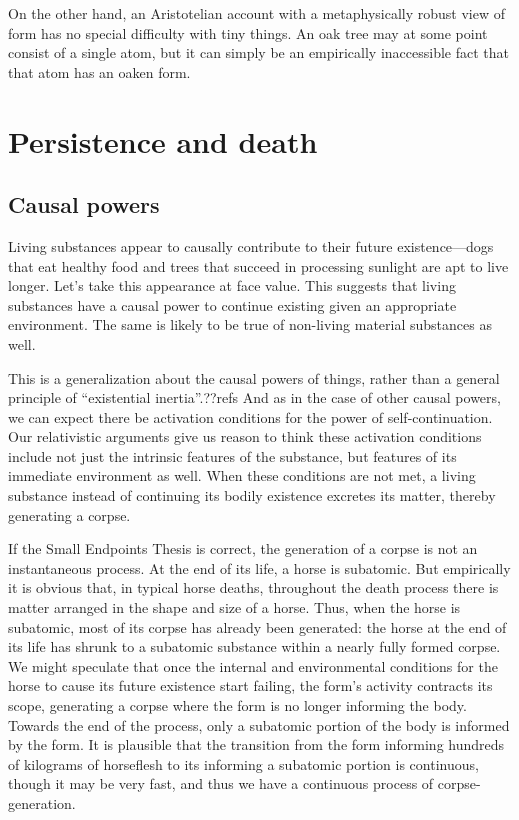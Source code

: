 On the other hand, an Aristotelian account with a metaphysically robust view of form has no special difficulty with 
tiny things. An oak tree may at some point consist of a single atom, but it can simply be an empirically inaccessible 
fact that that atom has an oaken form. 

\section{Persistence and death}
\subsection{Causal powers}
Living substances appear to causally contribute to their future existence---dogs that eat healthy food and trees that succeed
in processing sunlight are apt to live longer. Let's take this appearance at face value. This suggests that living substances
have a causal power to continue existing given an appropriate environment. The same is likely to be true of non-living material
substances as well. 

This is a generalization about the causal powers of things, rather than a general principle of ``existential inertia''.??refs
And as in the case of other causal powers, we can expect there be activation conditions for the power of self-continuation.
Our relativistic arguments give us reason to think these activation conditions include not just the intrinsic features 
of the substance, but features of its immediate environment as well. When these conditions are not met, a living 
substance instead of continuing its bodily existence excretes its matter, thereby generating a corpse. 

If the Small Endpoints Thesis is correct, the generation of a corpse is not an instantaneous process. At the end of its 
life, a horse is subatomic. But empirically it is obvious that, in typical horse deaths, throughout the death process there 
is matter arranged in the shape and size of a horse. Thus, when the horse is subatomic, most of its corpse has already been
generated: the horse at the end of its life has shrunk to a subatomic substance within a nearly fully formed corpse. We might speculate
that once the internal and environmental conditions for the horse to cause its future existence start failing, the form's 
activity contracts its scope, generating a corpse where the form is no longer informing the body. Towards the end
of the process, only a subatomic portion of the body is informed by the form. It is plausible that the transition from 
the form informing hundreds of kilograms of horseflesh to its informing a subatomic portion is continuous, though it may be 
very fast, and thus we have a continuous process of corpse-generation. 

